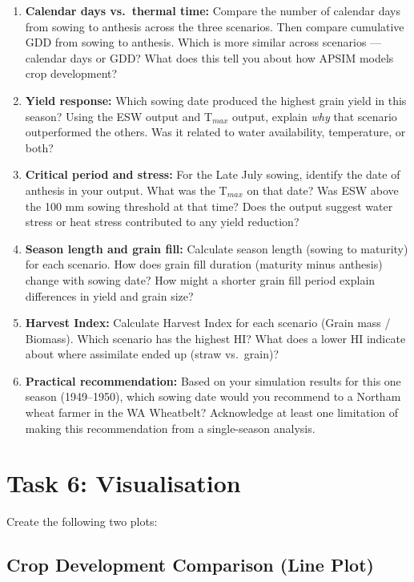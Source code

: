 \begin{enumerate}
  \item \textbf{Calendar days vs.~thermal time:} Compare the number of calendar days from sowing to anthesis across the three scenarios. Then compare cumulative GDD from sowing to anthesis. Which is more similar across scenarios --- calendar days or GDD? What does this tell you about how APSIM models crop development?

  \item \textbf{Yield response:} Which sowing date produced the highest grain yield in this season? Using the ESW output and T$_{max}$ output, explain \emph{why} that scenario outperformed the others. Was it related to water availability, temperature, or both?

  \item \textbf{Critical period and stress:} For the Late July sowing, identify the date of anthesis in your output. What was the T$_{max}$ on that date? Was ESW above the 100 mm sowing threshold at that time? Does the output suggest water stress or heat stress contributed to any yield reduction?

  \item \textbf{Season length and grain fill:} Calculate season length (sowing to maturity) for each scenario. How does grain fill duration (maturity minus anthesis) change with sowing date? How might a shorter grain fill period explain differences in yield and grain size?

  \item \textbf{Harvest Index:} Calculate Harvest Index for each scenario (Grain mass / Biomass). Which scenario has the highest HI? What does a lower HI indicate about where assimilate ended up (straw vs.~grain)?

  \item \textbf{Practical recommendation:} Based on your simulation results for this one season (1949--1950), which sowing date would you recommend to a Northam wheat farmer in the WA Wheatbelt? Acknowledge at least one limitation of making this recommendation from a single-season analysis.
\end{enumerate}

\section{Task 6: Visualisation}

Create the following two plots:

\subsection{Crop Development Comparison (Line Plot)}

